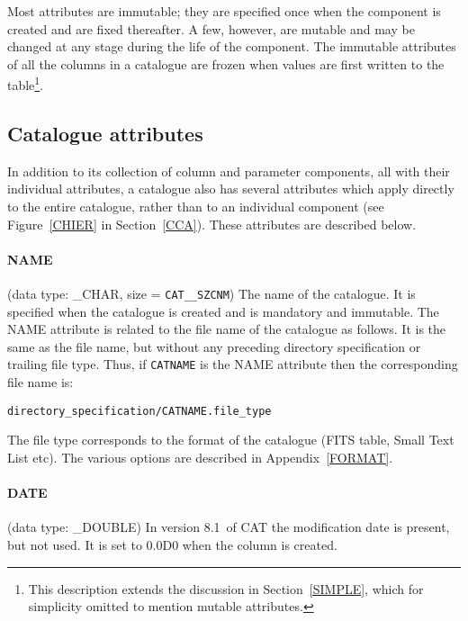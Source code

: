 \documentclass[11pt,twoside]{starlink}
\providecommand{\CATversion}{8.1~}
\begin{document}
Most attributes are immutable; they are specified once when the
component is created and are fixed thereafter. A few, however, are
mutable and may be changed at any stage during the life of the
component. The immutable attributes of all the columns in a catalogue
are frozen when values are first written to the table\footnote{This
description extends the discussion in Section~\ref{SIMPLE}, which for
simplicity omitted to mention mutable attributes.}.

\subsection{Catalogue attributes}

In addition to its collection of column and parameter
components,
all with their individual attributes, a catalogue also has several
attributes which apply directly to the entire catalogue, rather than to
an individual component (see Figure~\ref{CHIER} in Section~\ref{CCA}).
These attributes are described below.

\paragraph{NAME}
(data type: \_CHAR, size = \texttt{CAT\_\_SZCNM}) The name of the
catalogue. It is specified when the catalogue is created and is
mandatory and immutable. The NAME attribute is related to the file name
of the catalogue as follows. It is the same as the file name, but
without any preceding directory specification or trailing file type.
Thus, if \texttt{CATNAME} is the NAME attribute then the corresponding
file name is:

\begin{center}
\texttt{directory\_specification/CATNAME.file\_type}
\end{center}

The file type corresponds to the format of the catalogue (FITS table,
Small Text List etc). The various options are described in
Appendix~\ref{FORMAT}.

\paragraph{DATE}
(data type: \_DOUBLE)
In version \CATversion of CAT the modification date is present, but
not used. It is set to 0.0D0 when the column is created.
\end{document}
